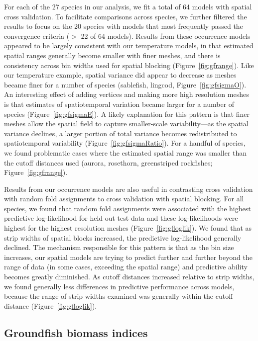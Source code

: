 \documentclass[11pt]{article}
\begin{document}
For each of the 27 species in our analysis, we fit a total of 64 models with
spatial cross validation. To facilitate comparisons across species, we further
filtered the results to focus on the 20 species with models that most
frequently passed the convergence criteria ($>$ 22 of 64 models). Results from
these occurrence models appeared to be largely consistent with our temperature
models, in that estimated spatial ranges generally become smaller with finer
meshes, and there is consistency across bin widths used for spatial blocking
(Figure~\ref{fig:gfrange}). Like our temperature example, spatial variance did
appear to decrease as meshes became finer for a number of species (sablefish,
lingcod, Figure~\ref{fig:gfsigmaO}). An interesting effect of adding vertices
and making more high resolution meshes is that estimates of spatiotemporal
variation became larger for a number of species (Figure~\ref{fig:gfsigmaE}). A
likely explanation for this pattern is that finer meshes allow the spatial
field to capture smaller-scale variability---as the spatial variance
declines, a larger portion of total variance becomes redistributed to
spatiotemporal variability (Figure~\ref{fig:gfsigmaRatio}). For a handful of
species, we found problematic cases where the estimated spatial range was
smaller than the cutoff distances used (aurora, rosethorn, greenstriped
rockfishes; Figure~\ref{fig:gfrange}).

Results from our occurrence models are also useful in contrasting cross
validation with random fold assignments to cross validation with spatial
blocking. For all species, we found that random fold assignments were
associated with the highest predictive log-likelihood for held out test data
and these log-likelihoods were highest for the highest resolution meshes
(Figure~\ref{fig:gfloglik}). We found that as strip widths of spatial blocks
increased, the predictive log-likelihood generally declined. The mechanism
responsible for this pattern is that as the bin size increases, our spatial
models are trying to predict further and further beyond the range of data (in
some cases, exceeding the spatial range) and predictive ability becomes greatly
diminished. As cutoff distances increased relative to strip widths, we found
generally less differences in predictive performance across models, because the
range of strip widths examined was generally within the cutoff distance
(Figure~\ref{fig:gfloglik}).

\subsection{Groundfish biomass indices}
\end{document}
